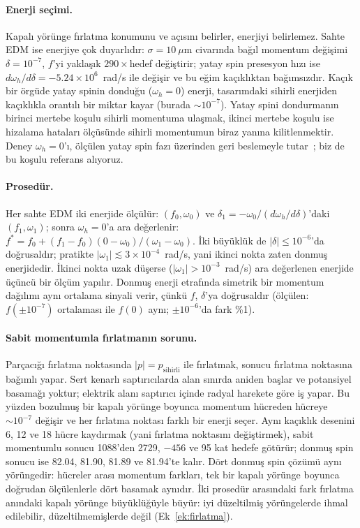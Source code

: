 \documentclass[12pt,a4paper]{extarticle}
\begin{document}
\paragraph{Enerji seçimi.} Kapalı yörünge fırlatma konumunu ve açısını belirler, enerjiyi belirlemez. Sahte
EDM ise enerjiye çok duyarlıdır: $\sigma=10~\mu$m civarında bağıl momentum değişimi $\delta=10^{-7}$, $f$'yi
yaklaşık $290\times$hedef değiştirir; yatay spin presesyon hızı ise $d\omega_h/d\delta=-5.24\times10^6$~rad/s
ile değişir ve bu eğim kaçıklıktan bağımsızdır. Kaçık bir örgüde yatay spinin donduğu ($\omega_h=0$) enerji,
tasarımdaki sihirli enerjiden kaçıklıkla orantılı bir miktar kayar (burada $\sim10^{-7}$). Yatay spini
dondurmanın birinci mertebe koşulu sihirli momentuma ulaşmak, ikinci mertebe koşulu ise hizalama hataları
ölçüsünde sihirli momentumun biraz yanına kilitlenmektir. Deney $\omega_h=0$'ı, ölçülen yatay spin fazı
üzerinden geri beslemeyle tutar~\cite{jedi_phaselock}; biz de bu koşulu referans alıyoruz.

\paragraph{Prosedür.} Her sahte EDM iki enerjide ölçülür: $(f_0,\omega_0)$ ve
$\delta_1=-\omega_0/(d\omega_h/d\delta)$'daki $(f_1,\omega_1)$; sonra $\omega_h=0$'a ara değerlenir:
$f^*=f_0+(f_1-f_0)(0-\omega_0)/(\omega_1-\omega_0)$. İki büyüklük de $|\delta|\le10^{-6}$'da doğrusaldır;
pratikte $|\omega_1|\lesssim3\times10^{-4}$~rad/s, yani ikinci nokta zaten donmuş enerjidedir. İkinci nokta
uzak düşerse ($|\omega_1|>10^{-3}$~rad/s) ara değerlenen enerjide üçüncü bir ölçüm yapılır. Donmuş enerji
etrafında simetrik bir momentum dağılımı aynı ortalama sinyali verir, çünkü $f$, $\delta$'ya doğrusaldır
(ölçülen: $f(\pm10^{-7})$ ortalaması ile $f(0)$ aynı; $\pm10^{-6}$'da fark \%1).

\paragraph{Sabit momentumla fırlatmanın sorunu.} Parçacığı fırlatma noktasında $|p|=p_\text{sihirli}$ ile
fırlatmak, sonucu fırlatma noktasına bağımlı yapar. Sert kenarlı saptırıcılarda alan sınırda aniden başlar ve
potansiyel basamağı yoktur; elektrik alanı saptırıcı içinde radyal harekete göre iş yapar. Bu yüzden bozulmuş
bir kapalı yörünge boyunca momentum hücreden hücreye $\sim10^{-7}$ değişir ve her fırlatma noktası farklı bir
enerji seçer. Aynı kaçıklık desenini 6, 12 ve 18 hücre kaydırmak (yani fırlatma noktasını değiştirmek), sabit
momentumlu sonucu 1088'den 2729, $-456$ ve 95 kat hedefe götürür; donmuş spin sonucu ise 82.04, 81.90, 81.89 ve
81.94'te kalır. Dört donmuş spin çözümü aynı yörüngedir: hücreler arası momentum farkları, tek bir kapalı
yörünge boyunca doğrudan ölçülenlerle dört basamak aynıdır. İki prosedür arasındaki fark fırlatma anındaki
kapalı yörünge büyüklüğüyle büyür: iyi düzeltilmiş yörüngelerde ihmal edilebilir, düzeltilmemişlerde değil
(Ek~\ref{ek:firlatma}).
\end{document}
